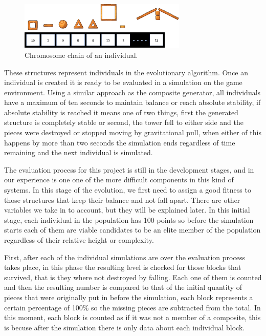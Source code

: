 \documentclass[conference]{IEEEtran}
\begin{document}
    \begin{figure}[htbp]
    \centerline{\includegraphics[width=80mm]{Images/chromosome_chain_example.png}}
    \caption{Chromosome chain of an individual.}
    \label{old_chrom}
    \end{figure}
    
    These structures represent individuals in the evolutionary algorithm. Once
    an individual is created it is ready to be evaluated in a simulation on the
    game environment. Using a similar approach as the composite generator, all
    individuals have a maximum of ten seconds to maintain balance or reach
    absolute stability, if absolute stability is reached it means one of two
    things, first the generated structure is completely stable or second, the
    tower fell to either side and the pieces were destroyed or stopped moving by
    gravitational pull, when either of this happens by more than two seconds the
    simulation ends regardless of time remaining and the next individual is
    simulated.

    The evaluation process for this project is still in the development stages,
    and in our experience is one one of the more difficult components in this
    kind of systems. In this stage of the evolution, we first need to assign a
    good fitness to those structures that keep their balance and not fall apart.
    There are other variables we take in to account, but they will be explained
    later. In this initial stage, each individual in the population has 100
    points so before the simulation starts each of them are viable candidates to
    be an elite member of the population regardless of their relative height or
    complexity.
    
    First, after each of the individual simulations are over the evaluation process
    takes place, in this phase the resulting level is checked for those blocks that
    survived, that is they where not destroyed by falling. Each one
    of them is counted and then the resulting number is compared to that of the
    initial quantity of pieces that were originally put in before the simulation,
    each block represents a certain percentage of 100\% so the missing pieces 
    are subtracted from the total. In this moment, each block is counted as if 
    it was not a member of a composite, this is becuse after the simulation there is
    only data about each individual block.
\end{document}
